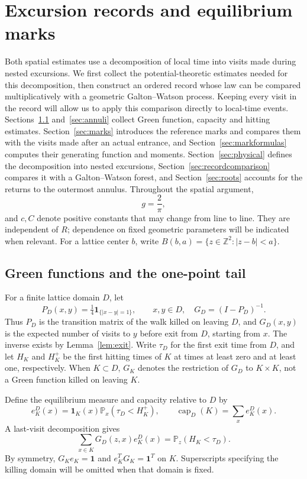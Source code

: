 \documentclass[11pt,letterpaper,reqno]{amsart}
\newif\ifrevmarks \revmarkstrue
\newcommand{\add}[1]{\ifrevmarks\textcolor{revorange}{#1}\else#1\fi}
\numberwithin{equation}{section}
\theoremstyle{remark}
\begin{document}
\section{Excursion records and equilibrium marks}\label{sec:records}
Both spatial estimates use a decomposition of local time into visits made during nested excursions. We first collect the potential-theoretic estimates needed for this decomposition, then construct an ordered record whose law can be compared multiplicatively with a geometric Galton--Watson process. Keeping every visit in the record will allow us to apply this comparison directly to local-time events. \add{Sections~\ref{sec:green} and~\ref{sec:annuli} collect Green function, capacity and hitting estimates. Section~\ref{sec:marks} introduces the reference marks and compares them with the visits made after an actual entrance, and Section~\ref{sec:markformulas} computes their generating function and moments. Section~\ref{sec:physical} defines the decomposition into nested excursions, Section~\ref{sec:recordcomparison} compares it with a Galton--Watson forest, and Section~\ref{sec:roots} accounts for the returns to the outermost annulus.} Throughout the spatial argument,
\[
g=\frac2\pi,
\]
and $c,C$ denote positive constants that may change from line to line. They are independent of $R$; dependence on fixed geometric parameters will be indicated when relevant. For a lattice center $b$, write $B(b,a)=\{z\in\mathbb Z^2:|z-b|<a\}$.

\subsection{Green functions and the one-point tail}\label{sec:green}
For a finite lattice domain $D$, let
\[
P_D(x,y)=\tfrac14\mathbf1_{\{|x-y|=1\}},\qquad x,y\in D,
\quad G_D=(I-P_D)^{-1}.
\]
\add{Thus $P_D$ is the transition matrix of the walk killed on leaving $D$, and $G_D(x,y)$ is the expected number of visits to $y$ before exit from $D$, starting from $x$.} The inverse exists by Lemma~\ref{lem:exit}. Write $\tau_D$ for the first exit time from $D$, and let $H_K$ and $H_K^+$ be the first hitting times of $K$ at times at least zero and at least one, respectively. When $K\subset D$, $G_K$ denotes the restriction of $G_D$ to $K\times K$, not a Green function killed on leaving $K$.

Define the equilibrium measure and capacity relative to $D$ by
\[
e_K^D(x)=\mathbf1_K(x)\mathbb P_x(\tau_D<H_K^+),\qquad
\operatorname{cap}_D(K)=\sum_x e_K^D(x).
\]
A last-visit decomposition gives
\begin{equation}\label{eq:2.4}
\sum_{x\in K}G_D(z,x)e_K^D(x)=\mathbb P_z(H_K<\tau_D).
\end{equation}
By symmetry, $G_Ke_K=\mathbf1$ and $e_K^TG_K=\mathbf1^T$ on $K$. Superscripts specifying the killing domain will be omitted when that domain is fixed.
\end{document}
